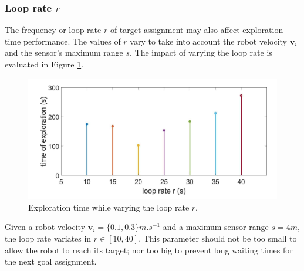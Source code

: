 \documentclass[11pt,openany]{book}
\begin{document}
\subsubsection{Loop rate $r$}
The frequency or loop rate $r$ of target assignment may also affect exploration time performance. The values of $r$ vary to take into account the robot velocity $\mathbf{v}_i$ and the sensor’s maximum range $s$. The impact of varying the loop rate is evaluated in Figure \ref{fig:3.12}.
\begin{figure}[H]
    \centering
    \includegraphics[scale=0.5]{assets/3_12.png}
    \caption{Exploration time while varying the loop rate $r$.}
    \label{fig:3.12}
\end{figure}
Given a robot velocity $\mathbf{v}_i=\{0.1,0.3\}m.s^{-1}$ and a maximum sensor range $s=4m$, the loop rate variates in $r \in [10,40]$. This parameter should not be too small to allow the robot to reach its target; nor too big to prevent long waiting times for the next goal assignment.
\end{document}
